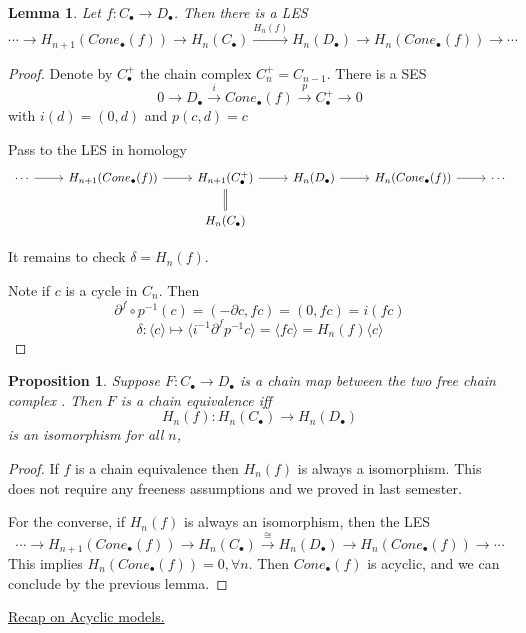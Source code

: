 \documentclass[11pt]{article}
\newtheorem{prop}[thm]{Proposition}
\newtheorem{lemma}[thm]{Lemma}
\newcommand{\pd}{\partial}
\newcommand{\lrta}{\longrightarrow}
\newcommand{\lgl}{\langle}
\newcommand{\rgl}{\rangle}
\begin{document}
\begin{lemma}
Let $f: C_\bullet\lrta D_\bullet$. Then there is a LES
$$
\cdots\lrta H_{n+1}(Cone_\bullet(f))\lrta H_n(C_\bullet)\overset{H_{n}(f)}{\lrta} H_n (D_\bullet)\lrta H_n(Cone_\bullet(f))\lrta \cdots
$$
\end{lemma}
\begin{proof}
Denote by $C^+_\bullet$ the chain complex $C^+_n=C_{n-1}$. There is a SES
$$
0\lrta D_\bullet\overset{i}{\lrta} Cone_\bullet(f)\overset{p}{\lrta} C^+_\bullet\lrta 0
$$
with $i(d)=(0,d)$ and $p (c,d)=c$

Pass to the LES in homology
\[
\begin{tikzcd}
\cdots  \arrow[r] & H_{n+1}(Cone_\bullet(f)) \arrow[r] & H_{n+1}(C^+_\bullet) \arrow[r] \arrow[d, equal] & H_n(D_\bullet) \arrow[r] & H_n(Cone_\bullet(f)) \arrow[r] & \cdots \\
 &  & H_n(C_\bullet) &  &  & 
\end{tikzcd}
\]

It remains to check $\delta=H_n(f)$.


Note if $c$ is a cycle in $C_n$. Then 
$$
\pd^f\circ p^{-1}(c)=(-\pd c, fc)=(0,fc)=i(fc)
$$
$$
\delta:\lgl c\rgl\longmapsto \lgl i^{-1}\pd^fp^{-1}c\rgl=\lgl fc\rgl= H_{n}(f)\lgl c\rgl
$$
\end{proof}

\begin{prop}
Suppose $F:C_\bullet\lrta D_\bullet$ is  a chain map between the two free chain complex . Then $F$ is a chain equivalence iff 
$$
H_n(f): H_n(C_\bullet)\lrta H_n(D_\bullet)
$$
is an isomorphism for all $n$,
\end{prop}
\begin{proof}
If $f$ is a chain equivalence then $H_n (f)$ is always a isomorphism. This does not require any freeness assumptions and we proved in last semester.

For the converse, if $H_n(f)$ is always an isomorphism, then the LES
$$
\cdots\lrta H_{n+1}(Cone_\bullet(f))\lrta H_n(C_\bullet)\overset{\cong}{\lrta} H_n (D_\bullet)\lrta H_n(Cone_\bullet(f))\lrta \cdots
$$
This implies $H_n(Cone_\bullet (f))=0,\forall n$. Then $Cone_\bullet(f)$ is acyclic, and we can conclude by the previous lemma.
\end{proof}

\underline{Recap on Acyclic models.}
\end{document}
